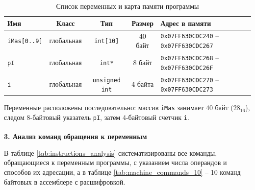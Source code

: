 \documentclass[14pt, a4paper]{extarticle}
\begin{document}
	\begin{table}[H]
		\centering
		\caption{Список переменных и карта памяти программы} \label{tab:mem_map}
		\begin{tabularx}{\textwidth}{|l|c|c|c|X|}
			\hline
			\textbf{Имя} & \textbf{Класс} & \textbf{Тип} & \textbf{Размер} & \textbf{Адрес в памяти} \\ \hline
			\texttt{iMas[0..9]} & глобальная & \texttt{int[10]} & 40 байт & \texttt{0x07FF630CDC240} -- \texttt{0x07FF630CDC267} \\ \hline
			\texttt{pI} & глобальная & \texttt{int*} & 8 байт & \texttt{0x07FF630CDC268} -- \texttt{0x07FF630CDC26F} \\ \hline
			\texttt{i} & глобальная & \texttt{unsigned int} & 4 байта & \texttt{0x07FF630CDC270} -- \texttt{0x07FF630CDC273} \\ \hline
		\end{tabularx}
	\end{table}

	Переменные расположены последовательно: массив \texttt{iMas} занимает 40 байт ($28_{16}$), следом 8-байтовый указатель \texttt{pI}, затем 4-байтовый счетчик \texttt{i}.
	\\\\
	\noindent \textbf{3. Анализ команд обращения к переменным}
	
	В таблице \ref{tab:instructions_analysis} систематизированы все команды, обращающиеся к переменным программы, с указанием числа операндов и способов их адресации, а в таблице \ref{tab:machine_commands_10} -- 10 команд байтовых в ассемблере с расшифровкой.
	
\end{document}
